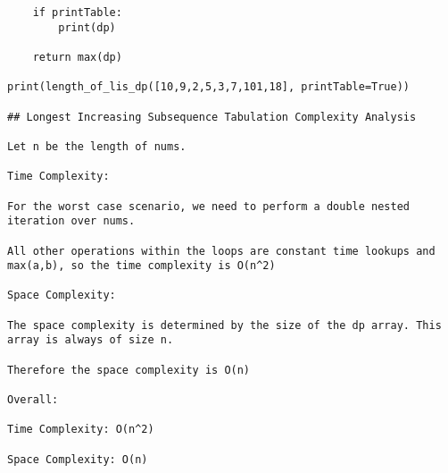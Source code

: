 \begin{verbatim}
    if printTable:
        print(dp)

    return max(dp)

print(length_of_lis_dp([10,9,2,5,3,7,101,18], printTable=True))

## Longest Increasing Subsequence Tabulation Complexity Analysis

Let n be the length of nums.

Time Complexity:

For the worst case scenario, we need to perform a double nested iteration over nums.

All other operations within the loops are constant time lookups and max(a,b), so the time complexity is O(n^2)

Space Complexity:

The space complexity is determined by the size of the dp array. This array is always of size n.

Therefore the space complexity is O(n)

Overall:

Time Complexity: O(n^2)

Space Complexity: O(n)


\end{verbatim}
